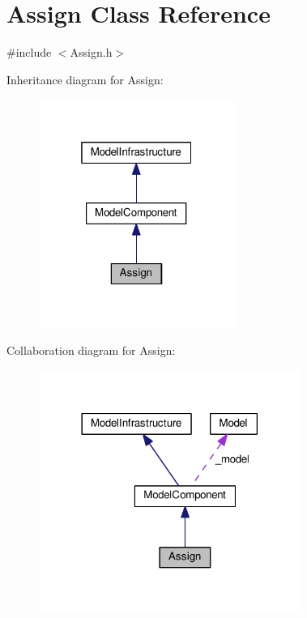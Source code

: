 \hypertarget{class_assign}{}\section{Assign Class Reference}
\label{class_assign}


{\ttfamily \#include $<$Assign.\+h$>$}



Inheritance diagram for Assign\+:
\nopagebreak
\begin{figure}[H]
\begin{center}
\leavevmode
\includegraphics[width=181pt]{class_assign__inherit__graph}
\end{center}
\end{figure}


Collaboration diagram for Assign\+:
\nopagebreak
\begin{figure}[H]
\begin{center}
\leavevmode
\includegraphics[width=242pt]{class_assign__coll__graph}
\end{center}
\end{figure}
